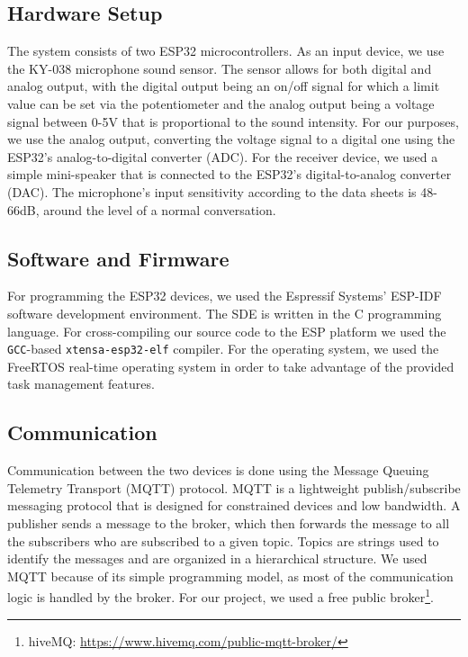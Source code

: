 \documentclass[conference]{IEEEtran}
\begin{document}
\subsection{Hardware Setup}
The system consists of two ESP32\cite{ESP32_Manual} microcontrollers.
As an input device, we use the KY-038\cite{KY-038} microphone sound sensor.
The sensor allows for both digital and analog output, with the digital output being an
on/off signal for which a limit value can be set via the potentiometer and the analog output being a voltage signal between 0-5V that is proportional to the sound intensity.
For our purposes, we use the analog output, converting the voltage signal to a digital one using the
ESP32's analog-to-digital converter (ADC).
For the receiver device, we used a simple mini-speaker that is connected to the ESP32's digital-to-analog converter (DAC).
The microphone's input sensitivity according to the data sheets is 48-66dB, around the level of a normal conversation.

\subsection{Software and Firmware}

For programming the ESP32 devices, we used the Espressif Systems' ESP-IDF\cite{ESP-IDF}
software development environment. The SDE is written in the C programming 
language. For cross-compiling our source code to the ESP platform we used the \texttt{GCC}-based
\texttt{xtensa-esp32-elf} compiler. 
For the operating system, we used the FreeRTOS\cite{FreeRTOS} real-time operating system
in order to take advantage of the provided task management features.
\subsection{Communication}

Communication between the two devices is done using the Message Queuing Telemetry Transport (MQTT) protocol\cite{MQTT_Survey}.
MQTT is a lightweight publish/subscribe messaging protocol that is designed for constrained devices and low bandwidth.
A publisher sends a message to the broker, which then forwards the message to all the subscribers who are subscribed to a given topic.
Topics are strings used to identify the messages and are organized in a hierarchical structure.
We used MQTT because of its simple programming model, as most of the communication logic is handled by the broker.
For our project, we used a free public broker\footnote{hiveMQ: \url{https://www.hivemq.com/public-mqtt-broker/}}.
\end{document}
